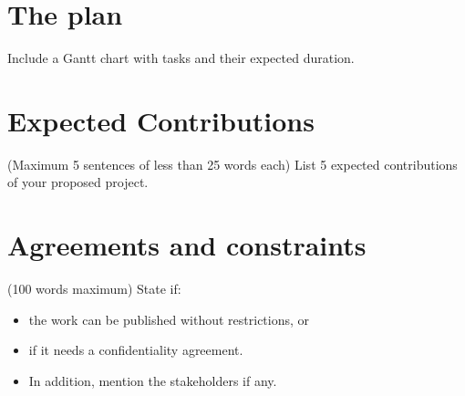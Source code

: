 \documentclass[11pt,a4paper]{article}
\begin{document}
\section{The plan}
Include a Gantt chart with tasks and their expected duration. 

\section{Expected Contributions}
(Maximum 5 sentences of less than 25 words each) List 5 expected contributions of your proposed project.
 
\section{Agreements and constraints}
(100 words maximum) State if: 

\begin{itemize}
\item the work can be published without restrictions, or 
\item if it needs a confidentiality agreement.
\item In addition, mention the stakeholders if any.
\end{itemize}




\end{document}
